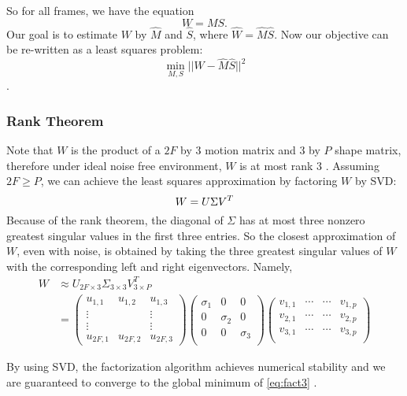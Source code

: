 So for all frames, we have the equation $$W = MS.$$
Our goal is to estimate $W$ by $\hat M$ and $\hat S$, where $\hat W = \hat M
\hat S$.
Now our objective can be re-written as a least squares problem:
\begin{equation}
  \label{eq:fact3}
\min_{M, S}||W - \hat M \hat S||^2
\end{equation}
\cite{Morita}.
\subsubsection{Rank Theorem}
Note that $W$ is the product of a $2F$ by $3$ motion matrix and
$3$ by $P$ shape matrix, therefore under ideal noise free environment,
$W$ is at most rank 3 \cite{Tomasi}. Assuming $2F \ge P$, we can
achieve the least squares approximation by factoring $W$ by SVD: $$W = U\Sigma V^T\\$$
Because of the rank theorem, the diagonal of $\Sigma$ has at most three nonzero
greatest singular values in the first three entries. So the closest approximation of $W$, even with noise,
is obtained by taking the three greatest singular values of $W$ with
the corresponding left and right eigenvectors. Namely,
\begin{align*}
W&\approx U_{2F\times 3}\Sigma_{3 \times 3} V_{3\times P}^T\\
&= \begin{pmatrix}
  u_{1,1} & u_{1,2} & u_{1,3} \\ \vdots & & \vdots
\\ \vdots & & \vdots
\\   u_{2F,1} & u_{2F,2} & u_{2F,3} 
\end{pmatrix}
\begin{pmatrix}
  \sigma_1 & 0 & 0 \\
  0 & \sigma_2 & 0 \\
  0 & 0 & \sigma_3 \\
\end{pmatrix}
\begin{pmatrix}
  v_{1,1} &  \cdots &\cdots & v_{1,p}\\
  v_{2,1} &  \cdots &\cdots & v_{2,p}\\
  v_{3,1} &  \cdots &\cdots & v_{3,p}\\
\end{pmatrix}
\end{align*}

By using SVD, the factorization algorithm achieves numerical stability
and we are guaranteed to converge to the global minimum of
\eqref{eq:fact3} \cite{Morris}. 

